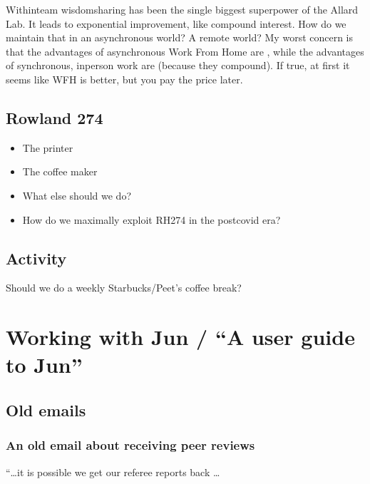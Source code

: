 \documentclass[letterpaper,10pt,english]{sphinxmanual}
\begin{document}
\sphinxAtStartPar
Within\sphinxhyphen{}team wisdom\sphinxhyphen{}sharing has been the single biggest superpower of the Allard Lab. It leads to exponential improvement, like compound interest. How do we maintain that in an asynchronous world? A remote world? My worst concern is that the advantages of asynchronous Work From Home are , while the advantages of synchronous, in\sphinxhyphen{}person work are  (because they compound). If true, at first it seems like WFH is better, but you pay the price later.


\section{Rowland 274}
\label{\detokenize{05Group:rowland-274}}\begin{itemize}
\item {} 
\sphinxAtStartPar
The printer

\item {} 
\sphinxAtStartPar
The coffee maker

\item {} 
\sphinxAtStartPar
What else should we do?

\item {} 
\sphinxAtStartPar
How do we maximally exploit RH274 in the post\sphinxhyphen{}covid era?

\end{itemize}


\section{Activity}
\label{\detokenize{05Group:activity}}
\sphinxAtStartPar
Should we do a weekly Starbucks/Peet’s coffee break?


\chapter{Working with Jun / “A user guide to Jun”}
\label{\detokenize{06UserGuideToJun:working-with-jun-a-user-guide-to-jun}}\label{\detokenize{06UserGuideToJun::doc}}

\section{Old e\sphinxhyphen{}mails}
\label{\detokenize{OldEmails:old-e-mails}}\label{\detokenize{OldEmails::doc}}

\subsection{An old e\sphinxhyphen{}mail about receiving peer reviews}
\label{\detokenize{OldEmails:an-old-e-mail-about-receiving-peer-reviews}}\label{\detokenize{OldEmails:receiving-reviews}}
\sphinxAtStartPar
“…it is possible we get our referee reports back …
\end{document}

